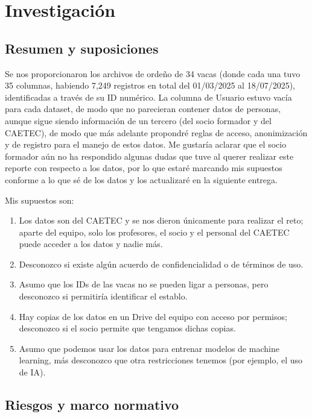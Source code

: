 \section{Investigación}

\subsection{Resumen y suposiciones}

Se nos proporcionaron los archivos de ordeño de 34 vacas (donde cada una tuvo 35 columnas, habiendo 7,249 registros en total del 01/03/2025 al 18/07/2025), identificadas a través de su ID numérico. La columna de Usuario estuvo vacía para cada dataset, de modo que no parecieran contener datos de personas, aunque sigue siendo información de un tercero (del socio formador y del CAETEC), de modo que más adelante propondré reglas de acceso, anonimización y de registro para el manejo de estos datos. Me gustaría aclarar que el socio formador aún no ha respondido algunas dudas que tuve al querer realizar este reporte con respecto a los datos, por lo que estaré marcando mis supuestos conforme a lo que sé de los datos y los actualizaré en la siguiente entrega.

Mis supuestos son:

\begin{enumerate}
  \item Los datos son del CAETEC y se nos dieron únicamente para realizar el reto; aparte del equipo, solo los profesores, el socio y el personal del CAETEC puede acceder a los datos y nadie más.
  \item Desconozco si existe algún acuerdo de confidencialidad o de términos de uso.
  \item Asumo que los IDs de las vacas no se pueden ligar a personas, pero desconozco si permitiría identificar el establo.
  \item Hay copias de los datos en un Drive del equipo con acceso por permisos; desconozco si el socio permite que tengamos dichas copias.
  \item Asumo que podemos usar los datos para entrenar modelos de machine learning, más desconozco que otra restricciones tenemos (por ejemplo, el uso de IA).
\end{enumerate}

\subsection{Riesgos y marco normativo}

